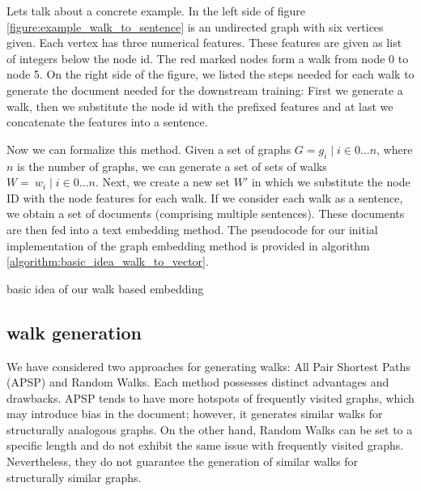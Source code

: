 Lets talk about a concrete example. In the left side of figure \ref{figure:example_walk_to_sentence} is an undirected graph with six vertices given. Each vertex has three numerical features. These features are given as list of integers below the node id. The red marked nodes form a walk from node 0 to node 5. On the right side of the figure, we listed the steps needed for each walk to generate the document needed for the downstream training: First we generate a walk, then we substitute the node id with the prefixed features and at last we concatenate the features into a sentence.

Now we can formalize this method. Given a set of graphs $G = {g_i \mid i \in 0 \dots n }$, where $n$ is the number of graphs, we can generate a set of sets of walks $W = {\ w_i \mid i \in 0 \dots n }$. Next, we create a new set $W'$ in which we substitute the node ID with the node features for each walk. If we consider each walk as a sentence, we obtain a set of documents (comprising multiple sentences). These documents are then fed into a text embedding method. The pseudocode for our initial implementation of the graph embedding method is provided in algorithm \ref{algorithm:basic_idea_walk_to_vector}.

\begin{minipage}{\linewidth}
    \begin{algorithm}[H]
        \DontPrintSemicolon



        \caption{basic idea of our walk based embedding}
        \label{algorithm:basic_idea_walk_to_vector}
    \end{algorithm}
\end{minipage}


\subsection{walk generation}
We have considered two approaches for generating walks: All Pair Shortest Paths (APSP) and Random Walks. Each method possesses distinct advantages and drawbacks. APSP tends to have more hotspots of frequently visited graphs, which may introduce bias in the document; however, it generates similar walks for structurally analogous graphs. On the other hand, Random Walks can be set to a specific length and do not exhibit the same issue with frequently visited graphs. Nevertheless, they do not guarantee the generation of similar walks for structurally similar graphs.

